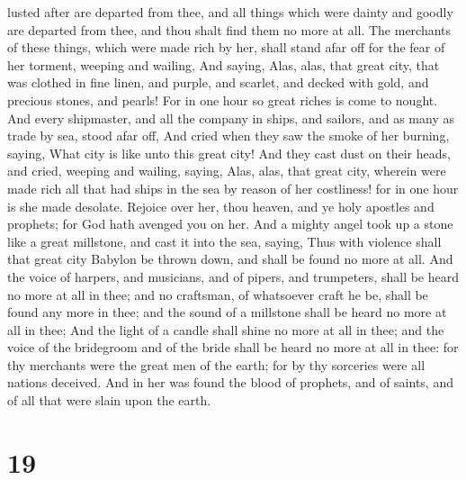 lusted after are departed from thee, and all things which were dainty
and goodly are departed from thee, and thou shalt find them no more at
all.  The merchants of these things, which were made rich
by her, shall stand afar off for the fear of her torment, weeping and
wailing,  And saying, Alas, alas, that great city, that was
clothed in fine linen, and purple, and scarlet, and decked with gold,
and precious stones, and pearls!  For in one hour so great
riches is come to nought. And every shipmaster, and all the company in
ships, and sailors, and as many as trade by sea, stood afar off,
 And cried when they saw the smoke of her burning, saying,
What city is like unto this great city!  And they cast dust
on their heads, and cried, weeping and wailing, saying, Alas, alas, that
great city, wherein were made rich all that had ships in the sea by
reason of her costliness! for in one hour is she made desolate.
 Rejoice over her, thou heaven, and ye holy apostles and
prophets; for God hath avenged you on her.  And a mighty
angel took up a stone like a great millstone, and cast it into the sea,
saying, Thus with violence shall that great city Babylon be thrown down,
and shall be found no more at all.  And the voice of
harpers, and musicians, and of pipers, and trumpeters, shall be heard no
more at all in thee; and no craftsman, of whatsoever craft he be, shall
be found any more in thee; and the sound of a millstone shall be heard
no more at all in thee;  And the light of a candle shall
shine no more at all in thee; and the voice of the bridegroom and of the
bride shall be heard no more at all in thee: for thy merchants were the
great men of the earth; for by thy sorceries were all nations deceived.
 And in her was found the blood of prophets, and of saints,
and of all that were slain upon the earth.

\hypertarget{section-18}{%
\section{19}\label{section-18}}

